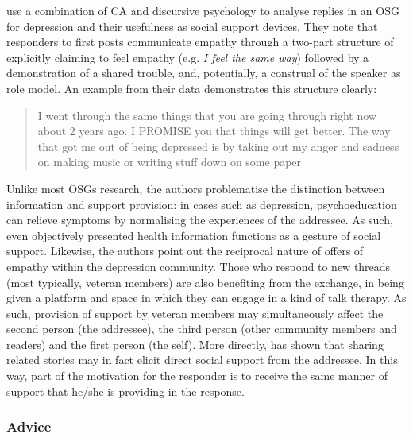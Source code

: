 \textcite{kaufman2016producing} use a combination of \gls{CA} and discursive psychology to analyse replies in an \gls{OSG} for depression and their usefulness as social support devices. They note that responders to first \glspl{post} communicate empathy through a two\hyp{}part structure of explicitly claiming to feel empathy (e.g. \emph{I feel the same way}) followed by a demonstration of a shared trouble, and, potentially, a construal of the speaker as role model. An example from their data demonstrates this structure clearly:

\begin{quote}\small\singlespacing
I went through the same things that you are going through right now about 2 years ago. I PROMISE you that things will get better. The way that got me out of being depressed is by taking out my anger and sadness on making music or writing stuff down on some paper \parencite*[p.~8]{kaufman2016producing} 
\end{quote}
%
Unlike most \glspl{OSG} research, the authors problematise the distinction between information and support provision: in cases such as depression, psychoeducation can relieve symptoms by normalising the experiences of the addressee. As such, even objectively presented health information functions as a gesture of social support. Likewise, the authors point out the reciprocal nature of offers of empathy within the depression community. Those who respond to new \glspl{thread} (most typically, veteran \glspl{member}) are also benefiting from the exchange, in being given a platform and space in which they can engage in a kind of talk therapy. As such, provision of support by veteran \glspl{member} may simultaneously affect the second person (the addressee), the third person (other community \glspl{member} and readers) and the first person (the self). More directly, \textcite{pudlinski_giving_1998} has shown that sharing related stories may in fact elicit direct social support from the addressee. In this way, part of the motivation for the responder is to receive the same manner of support that he\slash she is providing in the response.


\subsubsection{Advice} \label{sect:advice}

